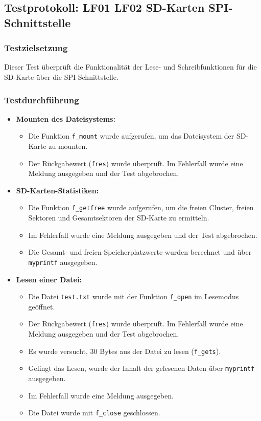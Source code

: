 \subsection{Testprotokoll: LF01 LF02 SD-Karten SPI-Schnittstelle}

\subsubsection{Testzielsetzung}
Dieser Test überprüft die Funktionalität der Lese- und Schreibfunktionen für die SD-Karte über die SPI-Schnittstelle.

\subsubsection{Testdurchführung}

\begin{itemize}
	\item \textbf{Mounten des Dateisystems:}
	\begin{itemize}
		\item Die Funktion \texttt{f\_mount} wurde aufgerufen, um das Dateisystem der SD-Karte zu mounten.
		\item Der Rückgabewert (\texttt{fres}) wurde überprüft. Im Fehlerfall wurde eine Meldung ausgegeben und der Test abgebrochen.
	\end{itemize}
	
	\item \textbf{SD-Karten-Statistiken:}
	\begin{itemize}
		\item Die Funktion \texttt{f\_getfree} wurde aufgerufen, um die freien Cluster, freien Sektoren und Gesamtsektoren der SD-Karte zu ermitteln.
		\item Im Fehlerfall wurde eine Meldung ausgegeben und der Test abgebrochen.
		\item Die Gesamt- und freien Speicherplatzwerte wurden berechnet und über \texttt{myprintf} ausgegeben.
	\end{itemize}
	
	\item \textbf{Lesen einer Datei:}
	\begin{itemize}
		\item Die Datei \texttt{test.txt} wurde mit der Funktion \texttt{f\_open} im Lesemodus geöffnet.
		\item Der Rückgabewert (\texttt{fres}) wurde überprüft. Im Fehlerfall wurde eine Meldung ausgegeben und der Test abgebrochen.
		\item Es wurde versucht, 30 Bytes aus der Datei zu lesen (\texttt{f\_gets}).
		\item Gelingt das Lesen, wurde der Inhalt der gelesenen Daten über \texttt{myprintf} ausgegeben.
		\item Im Fehlerfall wurde eine Meldung ausgegeben.
		\item Die Datei wurde mit \texttt{f\_close} geschlossen.
	\end{itemize}
	

\end{itemize}
